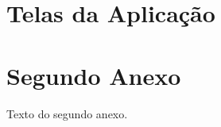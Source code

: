 \begin{anexosenv}

\partanexos

\chapter{Telas da Aplicação}
\label{chap:telas}

\chapter{Segundo Anexo}

Texto do segundo anexo.

\end{anexosenv}

